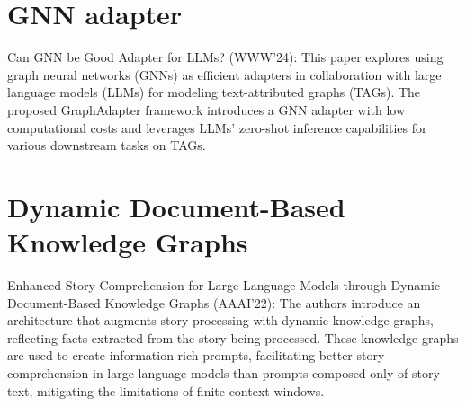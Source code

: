 \documentclass{sigkddExp}
\begin{document}
\section{GNN adapter}
\vspace{3mm}
Can GNN be Good Adapter for LLMs? (WWW'24): 
This paper explores using graph neural networks (GNNs) as efficient adapters in collaboration with large language models (LLMs) for modeling text-attributed graphs (TAGs). The proposed GraphAdapter framework introduces a GNN adapter with low computational costs and leverages LLMs' zero-shot inference capabilities for various downstream tasks on TAGs.

\section{Dynamic Document-Based Knowledge Graphs}
\vspace{3mm}
Enhanced Story Comprehension for Large Language Models through Dynamic Document-Based Knowledge Graphs (AAAI'22): 
The authors introduce an architecture that augments story processing with dynamic knowledge graphs, reflecting facts extracted from the story being processed. These knowledge graphs are used to create information-rich prompts, facilitating better story comprehension in large language models than prompts composed only of story text, mitigating the limitations of finite context windows.
\end{document}
